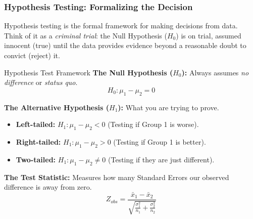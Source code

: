 \subsubsection{Hypothesis Testing: Formalizing the Decision}

Hypothesis testing is the formal framework for making decisions from data. Think of it as a \textit{criminal trial}: the Null Hypothesis ($H_0$) is on trial, assumed innocent (true) until the data provides evidence beyond a reasonable doubt to convict (reject) it.

\begin{defbox}{Hypothesis Test Framework}
\textbf{The Null Hypothesis ($H_0$):} Always assumes \textit{no difference} or \textit{status quo}.
\begin{equation}
H_0: \mu_1 - \mu_2 = 0 
\end{equation}

\textbf{The Alternative Hypothesis ($H_1$):} What you are trying to prove.
\begin{itemize}
    \item \textbf{Left-tailed:} $H_1: \mu_1 - \mu_2 < 0$ (Testing if Group 1 is worse).
    \item \textbf{Right-tailed:} $H_1: \mu_1 - \mu_2 > 0$ (Testing if Group 1 is better).
    \item \textbf{Two-tailed:} $H_1: \mu_1 - \mu_2 \neq 0$ (Testing if they are just different).
\end{itemize}

\textbf{The Test Statistic:} Measures how many Standard Errors our observed difference is away from zero.
\begin{equation}
Z_{obs} = \frac{\bar{x}_1 - \bar{x}_2}{\sqrt{\frac{\sigma_1^2}{n_1} + \frac{\sigma_2^2}{n_2}}}
\end{equation}
\end{defbox}


